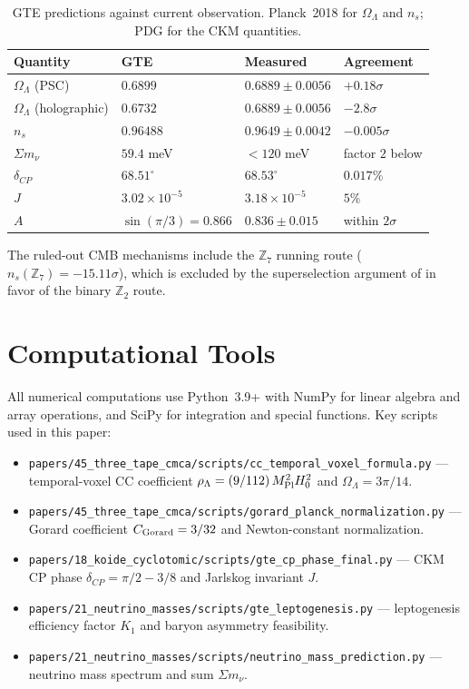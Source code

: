 \documentclass[11pt]{article}
\theoremstyle{remark}
\newcommand{\ZS}{\mathbb{Z}_7}
\newcommand{\ZT}{\mathbb{Z}_2}
\newcommand{\MPl}{M_{\rm Pl}}
\newcommand{\Hnought}{H_0}
\newcommand{\OmL}{\Omega_\Lambda}
\newcommand{\ns}{n_s}
\newcommand{\CGorard}{C_{\rm Gorard}}
\begin{document}
\begin{table}[h]
\centering
\small
\begin{tabularx}{\textwidth}{@{}lP{3.0cm}P{3.0cm}Y@{}}
\toprule
\textbf{Quantity} & \textbf{GTE} & \textbf{Measured} & \textbf{Agreement} \\
\midrule
$\OmL$ (PSC) & $0.6899$ & $0.6889\pm0.0056$ & $+0.18\sigma$ \\
$\OmL$ (holographic) & $0.6732$ & $0.6889\pm0.0056$ & $-2.8\sigma$ \\
$\ns$ & $0.96488$ & $0.9649\pm0.0042$ & $-0.005\sigma$ \\
$\Sigma m_\nu$ & $59.4$ meV & $<120$ meV & factor $2$ below \\
$\delta_{CP}$ & $68.51^\circ$ & $68.53^\circ$ & $0.017\%$ \\
$J$ & $3.02\times10^{-5}$ & $3.18\times10^{-5}$ & $5\%$ \\
$A$ & $\sin(\pi/3) = 0.866$ & $0.836\pm0.015$ & within $2\sigma$ \\
\bottomrule
\end{tabularx}
\caption{GTE predictions against current observation. Planck~2018 for
$\OmL$ and $\ns$; PDG for the CKM quantities.}
\label{tab:compare}
\end{table}

The ruled-out CMB mechanisms include the $\ZS$ running route ($\ns(\ZS) =
-15.11\sigma$), which is excluded by the superselection argument of
 in favor of the binary $\ZT$ route.

\section*{Computational Tools}

All numerical computations use Python~3.9+ with NumPy for linear algebra and
array operations, and SciPy for integration and special functions.
Key scripts used in this paper:

\begin{itemize}[noitemsep,topsep=2pt]
  \item \texttt{papers/45\_three\_tape\_cmca/scripts/cc\_temporal\_voxel\_formula.py}
        --- temporal-voxel CC coefficient
        $\rho_\Lambda = (9/112)\,\MPl^2\Hnought^2$ and
        $\OmL = 3\pi/14$.
  \item \texttt{papers/45\_three\_tape\_cmca/scripts/gorard\_planck\_normalization.py}
        --- Gorard coefficient $\CGorard = 3/32$ and Newton-constant
        normalization.
  \item \texttt{papers/18\_koide\_cyclotomic/scripts/gte\_cp\_phase\_final.py}
        --- CKM CP phase $\delta_{CP} = \pi/2 - 3/8$ and Jarlskog
        invariant $J$.
  \item \texttt{papers/21\_neutrino\_masses/scripts/gte\_leptogenesis.py}
        --- leptogenesis efficiency factor $K_1$ and baryon asymmetry
        feasibility.
  \item \texttt{papers/21\_neutrino\_masses/scripts/neutrino\_mass\_prediction.py}
        --- neutrino mass spectrum and sum $\Sigma m_\nu$.
\end{itemize}
\end{document}
